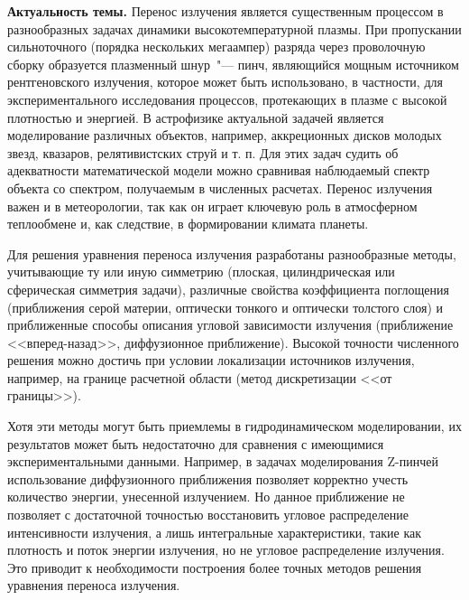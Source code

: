 \newcommand{\actuality}{{\textbf{Актуальность темы.}}}
\newcommand{\develop}{{\textbf{Степень разработанности темы.}}}
\newcommand{\aim}{{\textbf{Целями}}}
\newcommand{\tasks}{{\textbf{задачи}}}
\newcommand{\novelty}{{\textbf{Научная новизна:}}}
\newcommand{\influence}{{\textbf{Теоретическая и практическая значимость работы:}}}
\newcommand{\methodology}{{\textbf{Методология и методы исследования.}}}
\newcommand{\defpositions}{{\textbf{Положения, выносимые на~защиту}}}
\newcommand{\probation}{{\textbf{Степень достоверности и апробация результатов работы.}}}

{\actuality} Перенос излучения является существенным процессом в разнообразных задачах динамики высокотемпературной плазмы.
При пропускании сильноточного (порядка нескольких мегаампер) разряда через проволочную сборку образуется плазменный шнур~"--- пинч,
являющийся мощным источником рентгеновского излучения, которое может быть использовано, в частности, для экспериментального исследования процессов, протекающих в плазме с высокой плотностью и энергией. 
В астрофизике актуальной задачей является моделирование различных объектов, например, аккреционных дисков молодых звезд, квазаров, релятивистских струй и т. п.
Для этих задач судить об адекватности математической модели можно сравнивая наблюдаемый спектр объекта со спектром, получаемым в численных расчетах.
Перенос излучения важен и в метеорологии, так как он играет ключевую роль в атмосферном теплообмене и, как следствие, в формировании климата планеты.

Для решения уравнения переноса излучения разработаны разнообразные методы, учитывающие ту или иную симметрию (плоская, цилиндрическая или сферическая симметрия задачи), различные свойства коэффициента поглощения (приближения серой материи, оптически тонкого и оптически толстого слоя) и приближенные способы описания угловой зависимости излучения (приближение <<вперед-назад>>, диффузионное приближение). Высокой точности численного решения можно достичь при условии локализации источников излучения, например, на границе расчетной области (метод дискретизации <<от границы>>). 

Хотя эти методы могут быть приемлемы в гидродинамическом моделировании, их результатов может быть недостаточно для сравнения с имеющимися экспериментальными данными. Например, в задачах моделирования Z-пинчей использование диффузионного приближения позволяет корректно учесть количество энергии, унесенной излучением. Но данное приближение не позволяет с достаточной точностью восстановить угловое распределение интенсивности излучения, а лишь интегральные характеристики, такие как плотность и поток энергии излучения, но не угловое распределение излучения. Это приводит к необходимости построения более точных методов решения уравнения переноса излучения.

